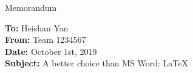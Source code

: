 \documentclass[12pt]{article}  %
\begin{document}
















\begin{letter}{Memorandum}
\begin{flushleft}  %
\textbf{To:} Heishan Yan\\
\textbf{From:} Team 1234567\\
\textbf{Date:} October 1st, 2019\\
\textbf{Subject:} A better choice than MS Word: \LaTeX
\end{flushleft}


\end{letter}
\end{document}
